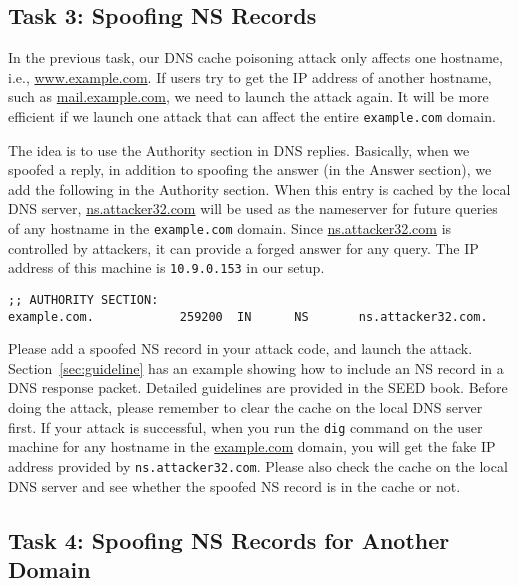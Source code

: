 \subsection{Task 3: Spoofing NS Records}

In the previous task, our DNS cache poisoning attack only affects 
one hostname, i.e., \url{www.example.com}. If users try to get the IP
address of another hostname, such as \url{mail.example.com}, we 
need to launch the attack again. It will be more efficient if we launch one
attack that can affect the entire \texttt{example.com} domain.  

The idea is to use the Authority section in DNS replies. 
Basically, when we spoofed a reply, in addition to spoofing the answer (in
the Answer section), we add the following in the Authority section.
When this entry is cached by the local DNS server, \url{ns.attacker32.com}
will be used as the nameserver for future queries of 
any hostname in the \texttt{example.com} domain.  Since 
\url{ns.attacker32.com} is controlled by attackers, it can
provide a forged answer for any query. The IP address 
of this machine is \texttt{10.9.0.153} in our setup. 

\begin{lstlisting}
;; AUTHORITY SECTION:
example.com.            259200  IN      NS       ns.attacker32.com.
\end{lstlisting}
 

Please add a spoofed NS record in your attack code, and launch the 
attack. Section~\ref{sec:guideline} has an example showing how to
include an NS record in a DNS response packet. 
Detailed guidelines are provided in the SEED book.
Before doing the attack, please remember to clear the cache on 
the local DNS server first.
If your attack is successful, when you run the \texttt{dig} command 
on the user machine for any hostname in the \url{example.com} domain, you will
get the fake IP address provided by \texttt{ns.attacker32.com}. Please also
check the cache on the local DNS server and see whether the spoofed 
NS record is in the cache or not.



\subsection{Task 4: Spoofing NS Records for Another Domain} 

